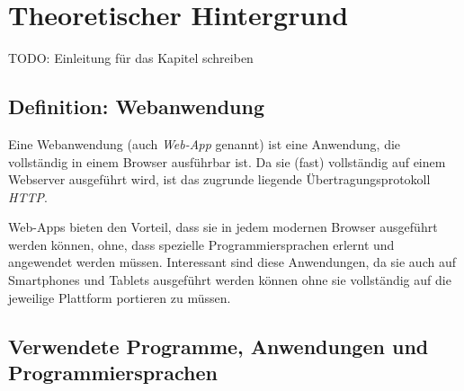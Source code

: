 \chapter{Theoretischer Hintergrund}
TODO: Einleitung für das Kapitel schreiben

\section{Definition: Webanwendung}
Eine Webanwendung (auch \emph{Web-App} genannt) ist eine Anwendung, die vollständig in einem Browser ausführbar ist. Da sie (fast) vollständig auf einem Webserver ausgeführt wird, ist das zugrunde liegende Übertragungsprotokoll \emph{HTTP}.\par

Web-Apps bieten den Vorteil, dass sie in jedem modernen Browser ausgeführt werden können, ohne, dass spezielle Programmiersprachen erlernt und angewendet werden müssen. Interessant sind diese Anwendungen, da sie auch auf Smartphones und Tablets ausgeführt werden können ohne sie vollständig auf die jeweilige Plattform portieren zu müssen.

\section{Verwendete Programme, Anwendungen und Programmiersprachen}
